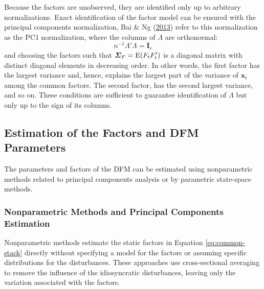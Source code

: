 \documentclass[12pt,twoside]{reedthesis}
\begin{document}
Because the factors are unobserved, they are identified only up to arbitrary normalizations. Exact identification of the factor model can be ensured with the principal components normalization, Bai \& Ng (\protect\hyperlink{ref-baing:2013}{2013}) refer to this normalization as the PC1 normalization, where the columns of \(\bm \varLambda\) are orthonormal:
\begin{equation}
  n^{-1} \bm \varLambda' \bm \varLambda= \bm I_{r} \label{eq:normalization}
\end{equation}
and choosing the factors such that \(\bm \varSigma_{F} = \operatorname{E}(F_{t}F_{t}')\) is a diagonal matrix with distinct diagonal elements in decreasing order. In other words, the first factor has the largest variance and, hence, explains the largest part of the variance of \(\bm x_{t}\) among the common factors. The second factor, has the second largest variance, and so on. These conditions are sufficient to guarantee identification of \(\bm \varLambda\) but only up to the sign of its columns.

\hypertarget{estimation-of-the-factors-and-dfm-parameters}{%
\subsection{Estimation of the Factors and DFM Parameters}\label{estimation-of-the-factors-and-dfm-parameters}}

The parameters and factors of the DFM can be estimated using nonparametric methods related to principal components analysis or by parametric state-space methods.

\hypertarget{nonparametric-methods-and-principal-components-estimation}{%
\subsubsection{Nonparametric Methods and Principal Components Estimation}\label{nonparametric-methods-and-principal-components-estimation}}

Nonparametric methods estimate the static factors in Equation \eqref{eq:common-stack} directly without specifying a model for the factors or assuming specific distributions for the disturbances. These approaches use cross-sectional averaging to remove the influence of the idiosyncratic disturbances, leaving only the variation associated with the factors.
\end{document}
